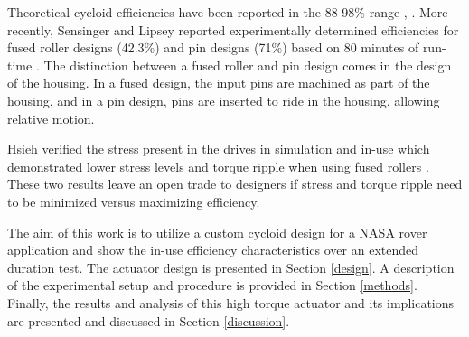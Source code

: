 Theoretical cycloid efficiencies have been reported in the 88-98\% range \cite{Malhorta}, \cite{unified_approach}.
More recently, Sensinger and Lipsey reported experimentally determined efficiencies for fused roller designs (42.3\%) and pin designs (71\%) based on 80 minutes of run-time \cite{cycloid_vs_harmonic}.
The distinction between a fused roller and pin design comes in the design of the housing.
In a fused design, the input pins are machined as part of the housing, and in a pin design, pins are inserted to ride in the housing, allowing relative motion.

Hsieh verified the stress present in the drives in simulation and in-use which demonstrated lower stress levels and torque ripple when using fused rollers \cite{hsieh_dynamics}.
These two results leave an open trade to designers if stress and torque ripple need to be minimized versus maximizing efficiency.

The aim of this work is to utilize a custom cycloid design for a NASA rover application and show the in-use efficiency characteristics over an extended duration test.
The actuator design is presented in Section \ref{design}.
A description of the experimental setup and procedure is provided in Section \ref{methods}.
Finally, the results and analysis of this high torque actuator and its implications are presented and discussed in Section \ref{discussion}.

